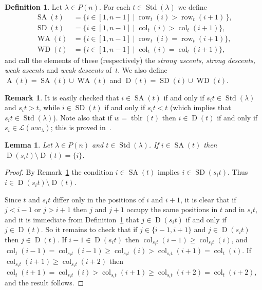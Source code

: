 \documentclass[10pt]{amsart}
\newtheorem{lemm}[theo]{Lemma}
\theoremstyle{definition}
\newtheorem{defi}[theo]{Definition}
\newtheorem{rema}[theo]{Remark}
\DeclareMathOperator{\perm}{tblr}
\DeclareMathOperator{\row}{row}
\DeclareMathOperator{\col}{col}
\DeclareMathOperator{\STD}{Std}
\DeclareMathOperator{\SD}{SD}
\DeclareMathOperator{\SA}{SA}
\DeclareMathOperator{\WD}{WD}
\DeclareMathOperator{\WA}{WA}
\DeclareMathOperator{\D}{D}
\DeclareMathOperator{\A}{A}
\begin{document}
\begin{defi}\label{ascentsdescentsdef}
Let $\lambda\in P(n)$. For each $t\in\STD(\lambda)$ we define
\begin{align*}
\SA(t) &= \{i\in[1,n-1] \mid \row_t(i) > \row_t(i+1)\,\},\\
\SD(t) &= \{i\in[1,n-1] \mid \col_t(i) > \col_t(i+1)\},\\
\WA(t) &= \{i\in[1,n-1] \mid \row_t(i)=\row_t(i+1)\},\\
\WD(t) &= \{i\in[1,n-1] \mid \col_t(i)=\col_t(i+1)\},
\end{align*}
and call the elements of these (respectively) the \emph{strong ascents, strong descents, weak ascents}
and \emph{weak descents} of~$t$.
We also define $\A(t)=\SA(t)\cup\WA(t)$ and
$\D(t)=\SD(t)\cup\WD(t)$.
\end{defi}
\begin{rema}\label{equalsubsetsS}
It is easily checked that
$i\in\SA(t)$ if and only if $s_it\in\STD(\lambda)$ and $s_it > t$,
while $i\in\SD(t)$ if and only if $s_it < t$ (which implies that
$s_it\in\STD(\lambda)$).
Note also that if $w=\perm(t)$ then $i\in\D(t)$ if
and only if $s_i\in \mathcal{L}(ww_{\lambda})$; this is proved
in~\cite[Lemma~5.2]{nguyen:wgideals2}.
\end{rema}

\begin{lemm}\label{dessjtminust}
Let $\lambda\in P(n)$ and $t\in\STD(\lambda)$. If $i\in\SA(t)$
then $\D(s_it)\setminus\D(t)=\{i\}$.
\end{lemm}

\begin{proof}
By Remark~\ref{equalsubsetsS} the condition $i\in\SA(t)$ implies
$i\in\SD(s_it)$. Thus $i\in\D(s_it)\setminus\D(t)$.

Since $t$ and $s_it$ differ only in the positions of $i$ and $i+1$, it
is clear that if $j<i-1$ or $j>i+1$ then $j$ and $j+1$ occupy the same
positions in $t$ and in $s_it$, and it is immediate from
Definition~\ref{ascentsdescentsdef} that $j\in\D(s_it)$ if and only
if $j\in\D(t)$. So it remains to check that if $j\in\{i-1,i+1\}$ and
$j\in\D(s_it)$ then $j\in\D(t)$. If $i-1\in\D(s_it)$ then
 $\col_{s_{i}t}(i-1)\geqslant\col_{s_{i}t}(i)$, and
$\col_t(i-1)=\col_{s_{i}t}(i-1)\geqslant\col_{s_{i}t}(i)>\col_{s_{i}t}(i+1)=\col_t(i)$.
If $\col_{s_{i}t}(i+1)\geqslant\col_{s_{i}t}(i+2)$ then
$\col_t(i+1)=\col_{s_{i}t}(i)>\col_{s_{i}t}(i+1)\geqslant\col_{s_{i}t}(i+2)=\col_t(i+2)$,
and the result follows.
\end{proof}
\end{document}
